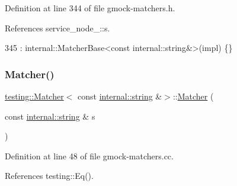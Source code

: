 Definition at line 344 of file gmock-\/matchers.\+h.



References service\+\_\+node\+\_\+::s.


\begin{DoxyCode}
345       : internal::MatcherBase<const internal::string&>(impl) \{\}
\end{DoxyCode}
\mbox{\label{classtesting_1_1Matcher_3_01const_01internal_1_1string_01_6_4_a5014c9227335b575a1c0167b9c609bf8}} 
\subsubsection{\texorpdfstring{Matcher()}{Matcher()}\hspace{0.1cm}{\footnotesize\ttfamily [3/4]}}
{\footnotesize\ttfamily \hyperlink{classtesting_1_1Matcher}{testing\+::\+Matcher}$<$ const \hyperlink{namespacetesting_1_1internal_a8e8ff5b11e64078831112677156cb111}{internal\+::string} \&$>$\+::\hyperlink{classtesting_1_1Matcher}{Matcher} (\begin{DoxyParamCaption}\item[{const \hyperlink{namespacetesting_1_1internal_a8e8ff5b11e64078831112677156cb111}{internal\+::string} \&}]{s }\end{DoxyParamCaption})}



Definition at line 48 of file gmock-\/matchers.\+cc.



References testing\+::\+Eq().


